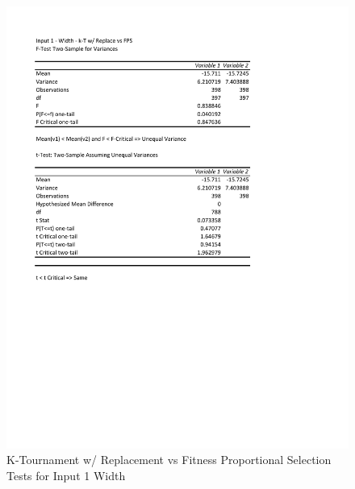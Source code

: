 \documentclass[times]{article}
\begin{document}
	\begin{figure}
		\caption{K-Tournament w/ Replacement vs Fitness Proportional Selection Tests for Input 1 Width}
		\label{fig:1parent1_moea}
		\includegraphics[width=\textwidth]{./t_test/1_parent1_moea.pdf}
	\end{figure}
\end{document}
